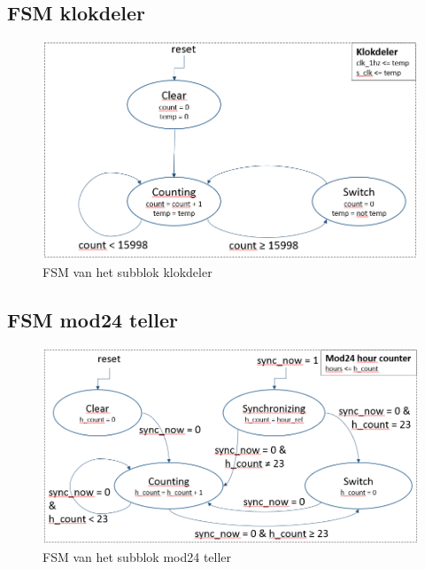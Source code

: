 \documentclass[a4paper, twoside, 10pt]{article}
\begin{document}
\newpage
\subsection{FSM klokdeler}
\begin{figure}[ht]
\begin{center}
\includegraphics[keepaspectratio=true,scale=0.75]{FSM_Klokdeler.png}
\caption{FSM van het subblok klokdeler}
\label{fig: klokdeler}
\end{center}
\end{figure}

\subsection{FSM mod24 teller}
\begin{figure}[ht]
\begin{center}
\includegraphics[keepaspectratio=true,scale=0.7]{FSM_Mod24_hour_counter.png}
\caption{FSM van het subblok mod24 teller}
\label{fig: mod24_teller}
\end{center}
\end{figure}

\newpage
\end{document}
